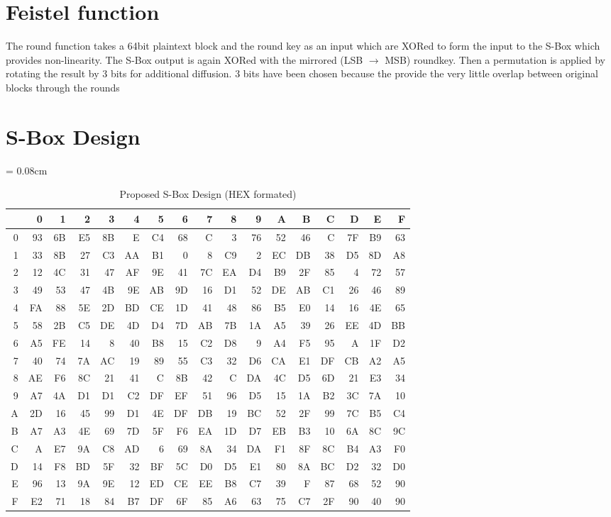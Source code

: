 \documentclass[a4paper]{article}
\begin{document}
    \section{Feistel function}
    The round function takes a 64bit plaintext block and the round key as an input which are XORed to form the input to the S-Box which provides non-linearity. The S-Box output is again XORed with the mirrored (LSB $\rightarrow$ MSB) roundkey. Then a permutation is applied by rotating the result by 3 bits for additional diffusion. 3 bits have been chosen because the provide the very little overlap between original blocks through the rounds
    \section{S-Box Design}
\begin{table}[h]
    \tabcolsep = 0.08cm
    \begin{tabular}{|r|rrrrrrrrrrrrrrrr|}
	\hline
	 & 0 & 1 & 2 & 3 & 4 & 5 & 6 & 7 & 8 & 9 & A & B & C & D & E & F \\ \hline
	 0 & 93 & 6B & E5 & 8B & E & C4 & 68 & C & 3 & 76 & 52 & 46 & C & 7F & B9 & 63 \\ 
	 1 & 33 & 8B & 27 & C3 & AA & B1 & 0 & 8 & C9 & 2 & EC & DB & 38 & D5 & 8D & A8 \\ 
	 2 & 12 & 4C & 31 & 47 & AF & 9E & 41 & 7C & EA & D4 & B9 & 2F & 85 & 4 & 72 & 57 \\ 
	 3 & 49 & 53 & 47 & 4B & 9E & AB & 9D & 16 & D1 & 52 & DE & AB & C1 & 26 & 46 & 89 \\ 
	 4 & FA & 88 & 5E & 2D & BD & CE & 1D & 41 & 48 & 86 & B5 & E0 & 14 & 16 & 4E & 65 \\ 
	 5 & 58 & 2B & C5 & DE & 4D & D4 & 7D & AB & 7B & 1A & A5 & 39 & 26 & EE & 4D & BB \\ 
	 6 & A5 & FE & 14 & 8 & 40 & B8 & 15 & C2 & D8 & 9 & A4 & F5 & 95 & A & 1F & D2 \\ 
	 7 & 40 & 74 & 7A & AC & 19 & 89 & 55 & C3 & 32 & D6 & CA & E1 & DF & CB & A2 & A5 \\ 
	 8 & AE & F6 & 8C & 21 & 41 & C & 8B & 42 & C & DA & 4C & D5 & 6D & 21 & E3 & 34 \\ 
	 9 & A7 & 4A & D1 & D1 & C2 & DF & EF & 51 & 96 & D5 & 15 & 1A & B2 & 3C & 7A & 10 \\ 
	 A & 2D & 16 & 45 & 99 & D1 & 4E & DF & DB & 19 & BC & 52 & 2F & 99 & 7C & B5 & C4 \\ 
	 B & A7 & A3 & 4E & 69 & 7D & 5F & F6 & EA & 1D & D7 & EB & B3 & 10 & 6A & 8C & 9C \\ 
	 C & A & E7 & 9A & C8 & AD & 6 & 69 & 8A & 34 & DA & F1 & 8F & 8C & B4 & A3 & F0 \\ 
	 D & 14 & F8 & BD & 5F & 32 & BF & 5C & D0 & D5 & E1 & 80 & 8A & BC & D2 & 32 & D0 \\ 
	 E & 96 & 13 & 9A & 9E & 12 & ED & CE & EE & B8 & C7 & 39 & F & 87 & 68 & 52 & 90 \\ 
	 F & E2 & 71 & 18 & 84 & B7 & DF & 6F & 85 & A6 & 63 & 75 & C7 & 2F & 90 & 40 & 90 \\ 
	 \hline
     \end{tabular}
     \caption{Proposed S-Box Design (HEX formated)}
     \label{sbox}
 \end{table}
\end{document}
